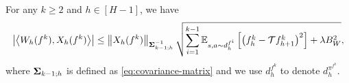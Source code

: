 \begin{lemma}
    \label{lemma:bilinear-upper-bound}
    For any $k\geq2$ and $h\in [H-1]$, we have
    \begin{equation}
        \left| \left\langle W_h(f^k), X_h(f^k) \right\rangle \right|\leq \left\| X_h(f^k) \right\|_{\boldsymbol \Sigma^{-1}_{k-1;h}}\sqrt{\sum_{i=1}^{k-1}\mathbb E_{s,a\sim d_h^{f^i}}\left[ \left( f_h^k-\mathcal T f_{h+1}^k \right)^2 \right]+\lambda B_W^2},
    \end{equation}
    where $\boldsymbol \Sigma_{k-1;h}$ is defined as \eqref{eq:covariance-matrix} and we use $d_h^{f^k}$ to denote $d_h^{\pi^{f^k}}$.
\end{lemma}
